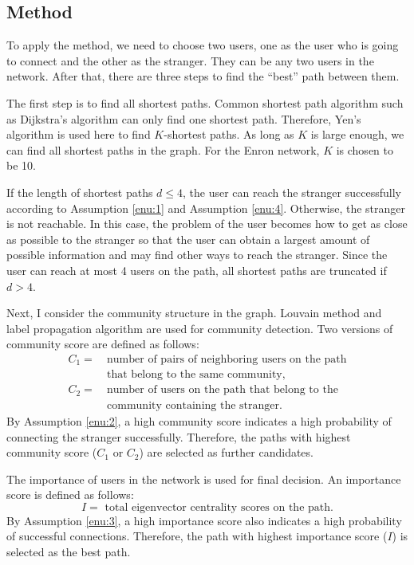\documentclass[journal]{IEEEtran}
\begin{document}
\subsection{Method}
To apply the method, we need to choose two users, one as the user who is going to connect and the other as the stranger. They can be any two users in the network. After that, there are three steps to find the ``best'' path between them.

The first step is to find all shortest paths. Common shortest path algorithm such as Dijkstra's algorithm can only find one shortest path. Therefore, Yen's algorithm is used here to find $K$-shortest paths. As long as $K$ is large enough, we can find all shortest paths in the graph. For the Enron network, $K$ is chosen to be 10.

If the length of shortest paths $d \le 4$, the user can reach the stranger successfully according to Assumption \ref{enu:1} and Assumption \ref{enu:4}. Otherwise, the stranger is not reachable. In this case, the problem of the user becomes how to get as close as possible to the stranger so that the user can obtain a largest amount of possible information and may find other ways to reach the stranger. Since the user can reach at most 4 users on the path, all shortest paths are truncated if $d > 4$.

Next, I consider the community structure in the graph. Louvain method and label propagation algorithm are used for community detection. Two versions of community score are defined as follows:
\begin{equation*}
\begin{split}
C_{1} = \ &\mbox{number of pairs of neighboring users on the path}\\
&  \mbox{that belong to the same community},\\
C_{2} =\ & \mbox{number of users on the path that belong to the}\\
& \mbox{community containing the stranger}.
\end{split}
\end{equation*}
By Assumption \ref{enu:2}, a high community score indicates a high probability of connecting the stranger successfully. Therefore, the paths with highest community score ($C_{1}$ or $C_{2}$) are selected as further candidates. 

The importance of users in the network is used for final decision. An importance score is defined as follows:
\begin{equation*}
I = \mbox{ total eigenvector centrality scores on the path}.
\end{equation*}
By Assumption \ref{enu:3}, a high importance score also indicates a high probability of successful connections. Therefore, the path with highest importance score ($I$) is selected as the best path.
\end{document}
